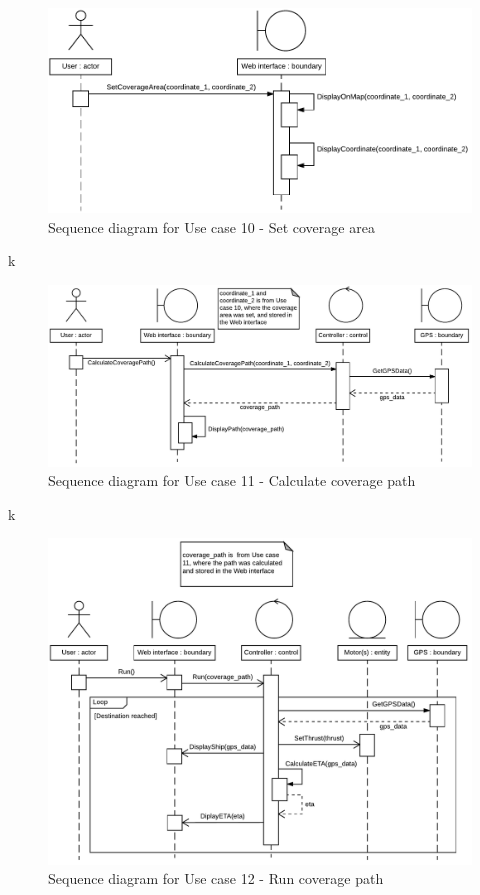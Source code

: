 \begin{figure}[H]
	\centering
	\includegraphics[width=1\linewidth]{Images/System_architecture/Use_case_10_SD}
	\caption{Sequence diagram for Use case 10 - Set coverage area}
\end{figure}

k

\begin{figure}[H]
	\centering
	\includegraphics[width=1\linewidth]{Images/System_architecture/Use_case_11_SD}
	\caption{Sequence diagram for Use case 11 - Calculate coverage path}
\end{figure}

k

\begin{figure}[H]
	\centering
	\includegraphics[width=1\linewidth]{Images/System_architecture/Use_case_12_SD}
	\caption{Sequence diagram for Use case 12 - Run coverage path}
\end{figure}

